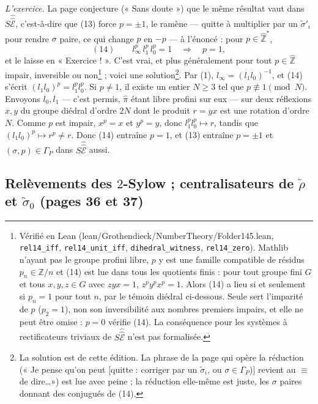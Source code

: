 \documentclass[11pt,a4paper]{article}
\begin{document}
\emph{L'exercice.} La page conjecture (« Sans doute ») que le même résultat vaut
dans $S\hat{\hat{\mathcal{E}}}$, c'est-à-dire que (13) force $p = \pm 1$, le
ramène — quitte à multiplier par un $\tilde\sigma'_i$ pour rendre $\sigma$
paire, ce qui change $p$ en $-p$ — à l'énoncé : pour $p \in
\widehat{\mathbb{Z}}^{*}$,
\[
(14)\qquad l_\infty^{p}\, l_1^{p}\, l_0^{p} = 1 \quad\Longrightarrow\quad p = 1,
\]
et le laisse en « Exercice ! ». C'est vrai, et plus généralement pour tout
$p \in \widehat{\mathbb{Z}}$ impair, inversible ou non\footnote{Vérifié en Lean
(lean/Grothendieck/NumberTheory/Folder145.lean, \texttt{rel14\_iff},
\texttt{rel14\_unit\_iff}, \texttt{dihedral\_witness}, \texttt{rel14\_zero}).
Mathlib n'ayant pas le groupe profini libre, $p$ y est une famille compatible
de résidus $p_n \in \mathbb{Z}/n$ et (14) est lue dans tous les quotients
finis : pour tout groupe fini $G$ et tous $x, y, z \in G$ avec $zyx = 1$,
$z^{p} y^{p} x^{p} = 1$. Alors (14) a lieu si et seulement si $p_n = 1$ pour
tout $n$, par le témoin diédral ci-dessous. Seule sert l'imparité de $p$
($p_2 = 1$), non son inversibilité aux nombres premiers impairs, et elle ne
peut être omise : $p = 0$ vérifie (14). La conséquence pour les systèmes à
rectificateurs triviaux de $S\hat{\hat{\mathcal{E}}}$ n'est pas formalisée.} ;
voici une solution\footnote{La
solution est de cette édition. La phrase de la page qui opère la réduction
(« Je pense qu'on peut [quitte : corriger par un $\tilde\sigma_i$, ou $\sigma \in
\Gamma_P$)] revient au $\equiv$ de dire\ldots ») est lue avec peine ; la réduction
elle-même est juste, les $\sigma$ paires donnant des conjugués de (14).}. Par
(1), $l_\infty = (l_1 l_0)^{-1}$, et (14) s'écrit $(l_1 l_0)^{p} = l_1^{p}
l_0^{p}$. Si $p \neq 1$, il existe un entier $N \geq 3$ tel que $p \not\equiv 1
\pmod N$. Envoyons $l_0, l_1$ — c'est permis, $\widehat{\pi}$ étant libre profini
sur eux — sur deux réflexions $x, y$ du groupe diédral d'ordre $2N$ dont le
produit $r = yx$ est une rotation d'ordre $N$. Comme $p$ est impair, $x^{p} = x$
et $y^{p} = y$, donc $l_1^{p} l_0^{p} \mapsto r$, tandis que $(l_1 l_0)^{p}
\mapsto r^{p} \neq r$. Donc (14) entraîne $p = 1$, et (13) entraîne $p = \pm 1$
et $(\sigma, p) \in \Gamma_P$ dans $S\hat{\hat{\mathcal{E}}}$ aussi.

\subsection*{Relèvements des $2$-Sylow ; centralisateurs de $\tilde\rho$ et
$\tilde\sigma_0$ (pages 36 et 37)}
\end{document}
